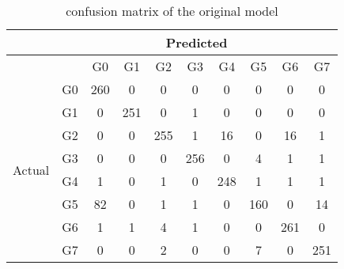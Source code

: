 
\begin{longtable}{cccccccccc}
\caption{confusion matrix of the original model}
\label{tab:my-table}\\
\cline{2-10}
                        & \multicolumn{9}{c}{Predicted}                      \\ \cline{2-10} 
\endfirsthead
%
\endhead
%
                        &    & G0  & G1  & G2  & G3  & G4  & G5  & G6  & G7  \\ \hline
\multirow{8}{*}{Actual} & G0 & 260 & 0   & 0   & 0   & 0   & 0   & 0   & 0   \\ \cline{2-2}
                        & G1 & 0   & 251 & 0   & 1   & 0   & 0   & 0   & 0   \\ \cline{2-2}
                        & G2 & 0   & 0   & 255 & 1   & 16  & 0   & 16  & 1   \\ \cline{2-2}
                        & G3 & 0   & 0   & 0   & 256 & 0   & 4   & 1   & 1   \\ \cline{2-2}
                        & G4 & 1   & 0   & 1   & 0   & 248 & 1   & 1   & 1   \\ \cline{2-2}
                        & G5 & 82  & 0   & 1   & 1   & 0   & 160 & 0   & 14  \\ \cline{2-2}
                        & G6 & 1   & 1   & 4   & 1   & 0   & 0   & 261 & 0   \\ \cline{2-2}
                        & G7 & 0   & 0   & 2   & 0   & 0   & 7   & 0   & 251 \\ \hline
\end{longtable}
